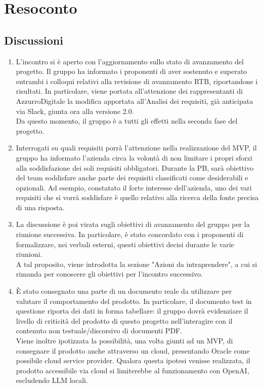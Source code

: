 \section{Resoconto} \label{sec:resoconto}
\subsection{Discussioni} \label{subsec:resdiscussione}
\begin{enumerate}
    \item L'incontro si è aperto con l'aggiornamento sullo stato di avanzamento del progetto. Il gruppo ha informato i proponenti di aver sostenuto e superato entrambi i colloqui relativi alla revisione di avanzamento RTB, riportandone i risultati. In particolare, viene portata all'attenzione dei rappresentanti di AzzurroDigitale la modifica apportata all'Analisi dei requisiti, già anticipata via Slack, giunta ora alla versione 2.0.\\Da questo momento, il gruppo è a tutti gli effetti nella seconda fase del progetto.
    \item Interrogati su quali requisiti porrà l'attenzione nella realizzazione del MVP, il gruppo ha informato l'azienda circa la volontà di non limitare i propri sforzi alla soddisfazione dei soli requisiti obbligatori. Durante la PB, sarà obiettivo del team soddisfare anche parte dei requisiti classificati come desiderabili e opzionali. Ad esempio, constatato il forte interesse dell'azienda, uno dei vari requisiti che si vorrà soddisfare è quello relativo alla ricerca della fonte precisa di una risposta.
    \item La discussione è poi virata sugli obiettivi di avanzamento del gruppo per la riunione successiva. In particolare, è stato concordato con i proponenti di formalizzare, nei verbali esterni, questi obiettivi decisi durante le varie riunioni.\\A tal proposito, viene introdotta la sezione "Azioni da intraprendere", a cui si rimanda per conoscere gli obiettivi per l'incontro successivo.
    \item È stato consegnato una parte di un documento reale da utilizzare per valutare il comportamento del prodotto. In particolare, il documento test in questione riporta dei dati in forma tabellare: il gruppo dovrà evidenziare il livello di criticità del prodotto di questo progetto nell'interagire con il contenuto non testuale/discorsivo di documenti PDF.\\Viene inoltre ipotizzata la possibilità, una volta giunti ad un MVP, di consegnare il prodotto anche attraverso un cloud, presentando Oracle come possibile cloud service provider. Qualora questa ipotesi venisse realizzata, il prodotto accessibile via cloud si limiterebbe al funzionamento con OpenAI, escludendo LLM locali.
\end{enumerate}

